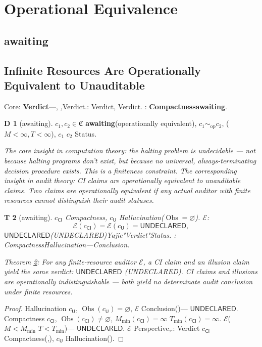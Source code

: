 \documentclass[12pt,a4paper]{article}
\theoremstyle{plain}
\newtheorem{theorem}Theorem[section]
\theoremstyle{definition}
\newtheorem{definition}[theorem]Definition
\theoremstyle{remark}
\newcommand{\ClaimSpace}{\mathfrak{C}}
\newcommand{\Null}{\varnothing}
\DeclareMathOperator{\ObsSet}{Obs}
\newcommand{\UD}{\mathsf{UNDECLARED}}
\begin{document}
\section{Operational Equivalence}
\subsection{awaiting}
\subsection{Infinite Resources Are Operationally Equivalent to Unauditable}
Core: \textbf{Verdict}---, \textit{,}Verdict.\textit{}: Verdict, \textit{}\textit{}Verdict.
: \textbf{Compactnessawaiting}.
\vspace{4pt}
\begin{definition}[awaiting]\label{def:operational_equivalence}
 $c_1, c_2 \in \ClaimSpace$ \textbf{awaiting}(operationally equivalent), $c_1 \sim_{\text{op}} c_2$, ($M < \infty, T < \infty$), $c_1$ $c_2$ Status.
\end{definition}
\vspace{4pt}
\noindent
\textit{The core insight in computation theory: the halting problem is undecidable --- not because halting programs don't exist, but because no universal, always-terminating decision procedure exists. This is a finiteness constraint. The corresponding insight in audit theory: CI claims are operationally equivalent to unauditable claims. Two claims are operationally equivalent if any actual auditor with finite resources cannot distinguish their audit statuses.}
\begin{theorem}[awaiting]\label{thm:operational_equivalence}
 $c_{\mathsf{CI}}$ Compactness, $c_{\mathsf{U}}$ Hallucination($\ObsSet = \Null$). $\mathcal{E}$: 
\begin{equation}
 \mathcal{E}(c_{\mathsf{CI}}) = \mathcal{E}(c_{\mathsf{U}}) = \UD,
\end{equation}
 $\UD$(UNDECLARED)Yajie"Verdict"Status.
: CompactnessHallucination---Conclusion.
\end{theorem}
\vspace{4pt}
\noindent
\textit{Theorem \ref{thm:operational_equivalence}: For any finite-resource auditor $\mathcal{E}$, a CI claim and an illusion claim yield the same verdict: $\UD$ (UNDECLARED). CI claims and illusions are operationally indistinguishable --- both yield no determinate audit conclusion under finite resources.}
\begin{proof}
Hallucination $c_{\mathsf{U}}$, $\ObsSet(c_{\mathsf{U}}) = \Null$, $\mathcal{E}$ Conclusion()--- $\UD$.
Compactness $c_{\mathsf{CI}}$, $\ObsSet(c_{\mathsf{CI}}) \neq \Null$, $M_{\min}(c_{\mathsf{CI}}) = \infty$ $T_{\min}(c_{\mathsf{CI}}) = \infty$. $\mathcal{E}$($M < M_{\min}$ $T < T_{\min}$)--- $\UD$.
 $\mathcal{E}$ Perspective,.: Verdict $c_{\mathsf{CI}}$ Compactness(,), $c_{\mathsf{U}}$ Hallucination().
\end{proof}
\end{document}
